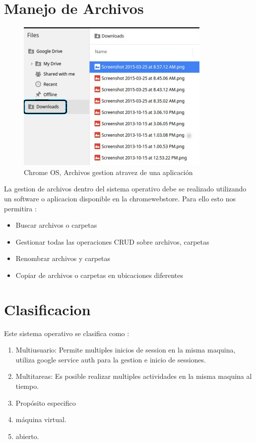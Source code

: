 \documentclass[paper=a4, fontsize=12pt]{article} 		%
\numberwithin{equation}{section}						%
\numberwithin{table}{section} 							%
\begin{document}
\section{Manejo de Archivos}
\begin{center}
\begin{figure}[H]
\includegraphics[scale=0.4]{imgs/files.png}
\caption{Chrome OS, Archivos gestion atravez de una aplicación}
\label{fig:files}
\end{figure}
\end{center}
La gestion de archivos dentro del sistema operativo debe se realizado utilizando un software o aplicacion disponible en la chromewebstore. Para ello esto nos permitira : 
\begin{itemize}
\item  Buscar archivos o carpetas
\item  Gestionar todas las operaciones CRUD sobre archivos, carpetas
\item  Renombrar archivos y carpetas
\item  Copiar de archivos o carpetas en ubicaciones diferentes
\end{itemize}

\section{Clasificacion}
Este sistema operativo se clasifica como :
\begin{enumerate}
\item Multiusuario:  Permite multiples inicios de session en la misma maquina, utiliza google service auth para la gestion e inicio de sessiones. 
\item Multitareas: Es posible realizar multiples actividades en la misma maquina al tiempo.
\item Propósito especifico
\item máquina virtual.
\item abierto. 
\end{enumerate}
\end{document}
